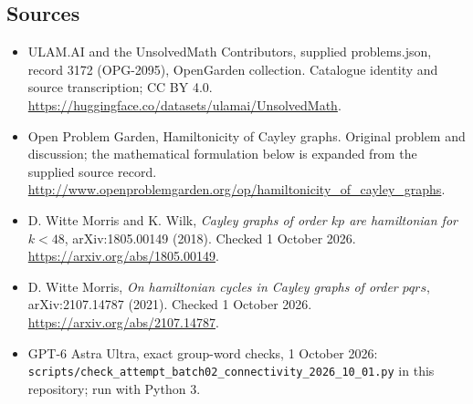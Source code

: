 \documentclass[11pt,a4paper]{article}
\begin{document}
\subsection{Sources}
\begin{itemize}
\item[S1] ULAM.AI and the UnsolvedMath Contributors, supplied problems.json, record 3172 (OPG-2095), OpenGarden collection. Catalogue identity and source transcription; CC BY 4.0.
\url{https://huggingface.co/datasets/ulamai/UnsolvedMath}.
\item[S2] Open Problem Garden, Hamiltonicity of Cayley graphs. Original problem and discussion; the mathematical formulation below is expanded from the supplied source record.
\url{http://www.openproblemgarden.org/op/hamiltonicity_of_cayley_graphs}.
\item[S3] D. Witte Morris and K. Wilk, \emph{Cayley graphs of order $kp$ are hamiltonian for $k<48$}, arXiv:1805.00149 (2018). Checked 1 October 2026.
\url{https://arxiv.org/abs/1805.00149}.
\item[S4] D. Witte Morris, \emph{On hamiltonian cycles in Cayley graphs of order $pqrs$}, arXiv:2107.14787 (2021). Checked 1 October 2026.
\url{https://arxiv.org/abs/2107.14787}.
\item[S5] GPT-6 Astra Ultra, exact group-word checks, 1 October 2026: \texttt{scripts/check\_attempt\_batch02\_connectivity\_2026\_10\_01.py} in this repository; run with Python 3.
\end{itemize}
\end{document}
